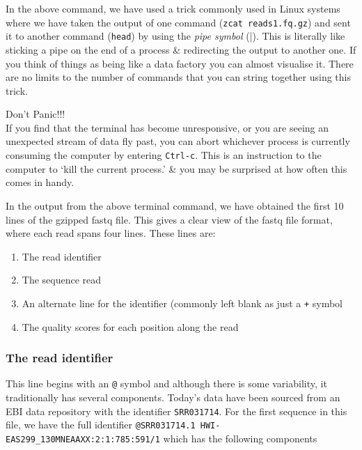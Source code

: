\begin{information}
In the above command, we have used a trick commonly used in Linux systems where we have taken the output of one command (\texttt{zcat reads1.fq.gz}) and sent it to another command (\texttt{head}) by using the \textit{pipe symbol} (|).
This is literally like sticking a pipe on the end of a process \& redirecting the output to another one.
If you think of things as being like a data factory you can almost visualise it.
There are no limits to the number of commands that you can string together using this trick. \\
\end{information}

\begin{warning}
\large{Don't Panic!!!} \\
\normalsize
If you find that the terminal has become unresponsive, or you are seeing an unexpected stream of data fly past, you can abort whichever process is currently consuming the computer by entering \texttt{Ctrl-c}.
This is an instruction to the computer to `kill the current process.' \& you may be surprised at how often this comes in handy.
\end{warning}

\begin{note}
In the output from the above terminal command, we have obtained the first 10 lines of the gzipped fastq file.
This gives a clear view of the fastq file format, where each read spans four lines.
These lines are:
\begin{enumerate}
\item The read identifier
\item The sequence read
\item An alternate line for the identifier (commonly left blank as just a \texttt{+} symbol
\item The quality scores for each position along the read
\end{enumerate}
\end{note}

\subsubsection*{The read identifier}
This line begins with an \texttt{@} symbol and although there is some variability, it traditionally has several components.
Today's data have been sourced from an EBI data repository with the identifier \texttt{SRR031714}.
For the first sequence in this file, we have the full identifier \texttt{@SRR031714.1 HWI-EAS299_130MNEAAXX:2:1:785:591/1} which has the following components \\

